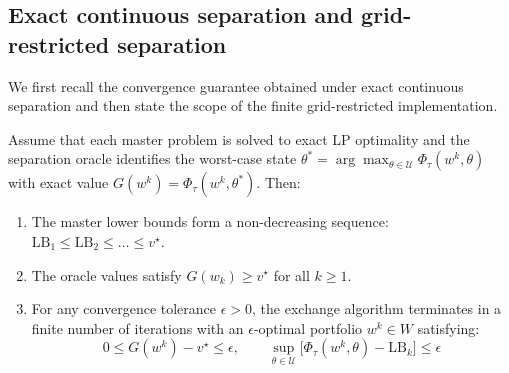 \documentclass[smallcondensed]{svjour3}
\begin{document}
\subsection{Exact continuous separation and grid-restricted separation}
We first recall the convergence guarantee obtained under exact continuous separation and then state the scope of the finite grid-restricted implementation.

\begin{proposition}
Assume that each master problem is solved to exact LP optimality and the separation oracle identifies the worst-case state $\theta^* = \arg\max_{\theta \in \mathcal{U}} \Phi_\tau(w^k, \theta)$ with exact value $G(w^k) = \Phi_\tau(w^k, \theta^*)$. Then:
\begin{enumerate}
    \item The master lower bounds form a non-decreasing sequence: $\mathrm{LB}_1 \le \mathrm{LB}_2 \le \dots \le v^\star$.
    \item The oracle values satisfy $G(w_k) \ge v^\star$ for all $k \ge 1$.
    \item For any convergence tolerance $\epsilon > 0$, the exchange algorithm terminates in a finite number of iterations with an $\epsilon$-optimal portfolio $w^k \in W$ satisfying:
    \begin{equation}
        0 \le G(w^k) - v^\star \le \epsilon, \qquad \sup_{\theta \in \mathcal{U}} \bigl[\Phi_\tau(w^k, \theta) - \mathrm{LB}_k\bigr] \le \epsilon
    \end{equation}
\end{enumerate}
\end{proposition}
\end{document}
